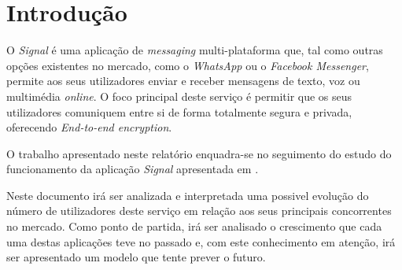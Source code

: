\section{Introdução}

O \textit{Signal} é uma aplicação de \textit{messaging} multi-plataforma que, tal como outras opções existentes no mercado, como o \textit{WhatsApp} ou o \textit{Facebook Messenger}, permite aos seus utilizadores enviar e receber mensagens de texto, voz ou multimédia \textit{online}. O foco principal deste serviço é permitir que os seus utilizadores comuniquem entre si de forma totalmente segura e privada, oferecendo \textit{End-to-end encryption}.

O trabalho apresentado neste relatório enquadra-se no seguimento do estudo do funcionamento da aplicação \textit{Signal} apresentada em \cite{past_report}.

Neste documento irá ser analizada e interpretada uma possivel evolução do número de utilizadores deste serviço em relação aos seus principais concorrentes no mercado. Como ponto de partida, irá ser analisado o crescimento que cada uma destas aplicações teve no passado e, com este conhecimento em atenção, irá ser apresentado um modelo que tente prever o futuro.

